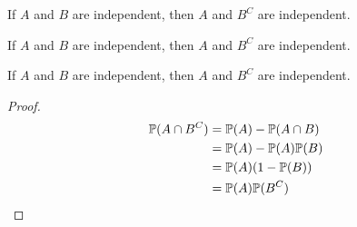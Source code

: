 \begin{note}
  \begin{field}
    \begin{prop}
      If $A$ and $B$ are independent, then $A$ and $B^C$ are independent.
    \end{prop}
  \end{field}
  \begin{field}
    \begin{prop}
      If $A$ and $B$ are independent, then $A$ and $B^C$ are independent.
    \end{prop}
  \end{field}
  \xplain{}%
\end{note}

%
\begin{note}
  \begin{field}
    \begin{prop}
      If $A$ and $B$ are independent, then $A$ and $B^C$ are independent.
    \end{prop}
  \end{field}
  \begin{field}
    \begin{proof}
      \begin{align*}
        \P(A\cap B^C) &= \P(A) - \P(A\cap B)\\
        &= \P(A) - \P(A)\P(B)\\
        &= \P(A)(1 - \P(B))\\
        &= \P(A)\P(B^C)
      \end{align*}
    \end{proof}
  \end{field}
  \xplain{}%
\end{note}

